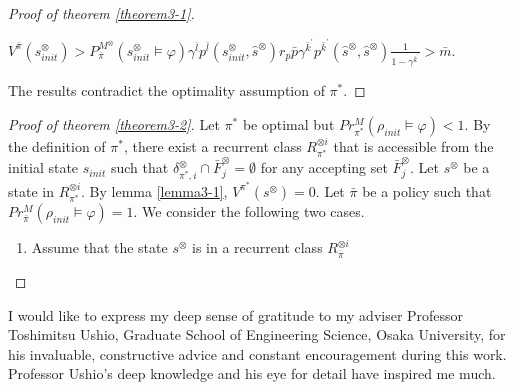 \documentclass[a4j,12pt,oneside,openany,english,dvipdfmx]{jsbook}
\begin{document}
\begin{proof}[Proof of theorem \ref{theorem3-1}]
\begin{enumerate}
     $V^{\bar{\pi}}(s^{\otimes}_{init}) > P^{M^{\otimes}}_{\bar{\pi}}(s^{\otimes}_{init} \models \varphi) \gamma^{\bar{l}} p^{\bar{l}}(s^{\otimes}_{init}, \hat{s}^{\otimes}) r_p \bar{p} \gamma^{\bar{k}^{\prime}} p^{\bar{k}^{\prime}}(\hat{s}^{\otimes},\hat{s}^{\otimes}) \frac{1}{ 1 - \gamma^{\bar{k}^{\prime}} } > \bar{m}$.
  \end{enumerate}

The results contradict the optimality assumption of $\pi^{\ast}$.
\end{proof}

\begin{proof}[Proof of theorem \ref{theorem3-2}]
  Let $\pi^{\ast}$ be optimal but $Pr^M_{\pi^{\ast}}(\rho_{init} \models \varphi) < 1$. By the definition of $\pi^{\ast}$, there exist a recurrent class $R^{\otimes i}_{\pi^{\ast}}$ that is accessible from the initial state $s_{init}$ such that $\delta^{\otimes}_{\pi^{\ast},i} \cap \bar{F}^{\otimes}_j = \emptyset$ for any accepting set $\bar{F}^{\otimes}_j$. Let $s^{\otimes}$ be a state in $R^{\otimes i}_{\pi^{\ast}}$. By lemma \ref{lemma3-1}, $V^{\pi^{\ast}}(s^{\otimes}) = 0$. Let $\bar{\pi}$ be a policy such that $Pr^M_{\bar{\pi}}(\rho_{init} \models \varphi) = 1$. We consider the following two cases.

  \begin{enumerate}
    \item Assume that the state $s^{\otimes}$ is in a recurrent class $R^{\otimes i}_{\bar{\pi}}$ \\


  \end{enumerate}

\end{proof}

\begin{acknowledgement}
	I would like to express my deep sense of gratitude to my adviser Professor
	Toshimitsu Ushio, Graduate School of Engineering Science, Osaka University,
	for his invaluable, constructive advice and constant encouragement during this work.
	Professor Ushio's deep knowledge and his eye for detail have inspired me much.
\end{acknowledgement}
\end{document}
